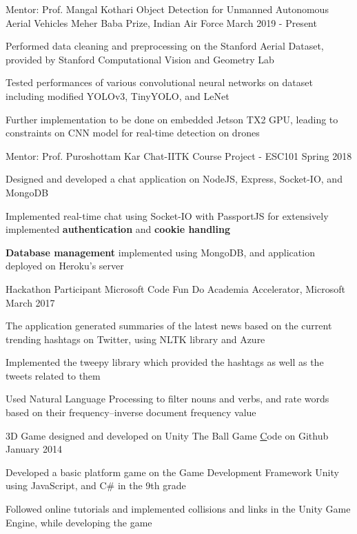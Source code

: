 
\begin{cventries}
  \cventry
    {Mentor: Prof. Mangal Kothari}
    {Object Detection for Unmanned Autonomous Aerial Vehicles}
    {Meher Baba Prize, Indian Air Force}
    {March 2019 - Present}
    {
      \begin{cvitems}
        \item {Performed data cleaning and preprocessing on the Stanford Aerial Dataset, provided by Stanford Computational Vision and Geometry Lab}
        \item {Tested performances of various convolutional neural networks on dataset including modified YOLOv3, TinyYOLO, and LeNet}
        \item {Further implementation to be done on embedded Jetson TX2 GPU, leading to constraints on CNN model for real-time detection on drones}
      \end{cvitems}
    }
  \cventry
    {Mentor: Prof. Puroshottam Kar}
    {Chat-IITK}
    {Course Project - ESC101}
    {Spring 2018}
    {
      \begin{cvitems}
        \item {Designed and developed a chat application on NodeJS, Express, Socket-IO, and MongoDB}
        \item {Implemented real-time chat using Socket-IO with PassportJS for extensively implemented \textbf{authentication} and \textbf{cookie handling}}
        \item {\textbf{Database management} implemented using MongoDB, and application deployed on Heroku's server}
      \end{cvitems}
    }

  \cventry
    {Hackathon Participant}
    {Microsoft Code Fun Do} 
    {Academia Accelerator, Microsoft}
    {March 2017}
    {
      \begin{cvitems} 
        \item {The application generated summaries of the latest news based on the current trending hashtags on Twitter, using NLTK library and Azure}
        \item {Implemented the tweepy library which provided the hashtags as well as the tweets related to them}
        \item {Used Natural Language Processing to filter nouns and verbs, and rate words based on their frequency–inverse document frequency value}
      \end{cvitems}
    }

  \cventry
    {3D Game designed and developed on Unity} 
    {The Ball Game} 
    {\href{https://github.com/7ayushgupta/UnityGame}Code on Github}
    {January 2014}
    {
      \begin{cvitems}
        \item {Developed a basic platform game on the Game Development Framework Unity using JavaScript, and C\# in the 9th grade}
        \item {Followed online tutorials and implemented collisions and links in the Unity Game Engine, while developing the game}
      \end{cvitems}
    }

\end{cventries}
